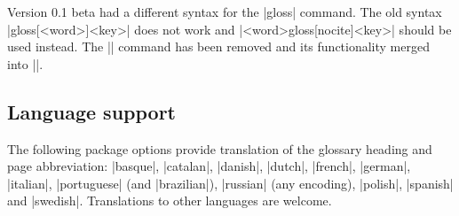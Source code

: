 \documentclass{ltxguide}
\newcommand{\gloss}{\textsf{gloss}}
\begin{document}
Version 0.1 beta had a different syntax for the |\gloss| 
command. The old syntax |\gloss[<word>]{<key>}| does not work
and |<word>\gloss[nocite]{<key>}| should be used instead. The
|\glossstyle| command has been removed and its functionality
merged into |\newgloss|.

\subsection{Language support}

The following package options provide translation of the glossary 
heading and page abbreviation: |basque|, |catalan|, |danish|, |dutch|, 
|french|, |german|, |italian|, |portuguese| (and |brazilian|), 
|russian| (any encoding), |polish|, |spanish| and |swedish|.  
Translations to other languages are welcome.
\end{document}
